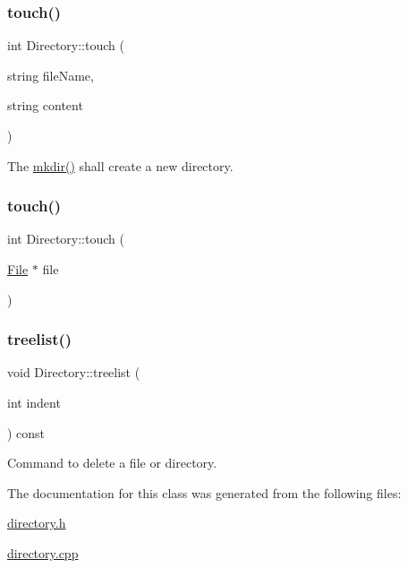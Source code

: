 \subsubsection{\texorpdfstring{touch()}{touch()}\hspace{0.1cm}{\footnotesize\ttfamily [1/2]}}
{\footnotesize\ttfamily int Directory\+::touch (\begin{DoxyParamCaption}\item[{string}]{file\+Name,  }\item[{string}]{content }\end{DoxyParamCaption})}



The \hyperlink{class_directory_adfec0eb4ee88844c1483363b14543e92}{mkdir()} shall create a new directory. 

\mbox{\label{class_directory_ab78fbd1a38c3e9f3926372f9fb2ccf5e}} 
\subsubsection{\texorpdfstring{touch()}{touch()}\hspace{0.1cm}{\footnotesize\ttfamily [2/2]}}
{\footnotesize\ttfamily int Directory\+::touch (\begin{DoxyParamCaption}\item[{\hyperlink{class_file}{File} $\ast$}]{file }\end{DoxyParamCaption})}

\mbox{\label{class_directory_af21c038562a88b24df0cb6e0c361febd}} 
\subsubsection{\texorpdfstring{treelist()}{treelist()}}
{\footnotesize\ttfamily void Directory\+::treelist (\begin{DoxyParamCaption}\item[{int}]{indent }\end{DoxyParamCaption}) const}



Command to delete a file or directory. 



The documentation for this class was generated from the following files\+:\begin{DoxyCompactItemize}
\item 
\hyperlink{directory_8h}{directory.\+h}\item 
\hyperlink{directory_8cpp}{directory.\+cpp}\end{DoxyCompactItemize}
